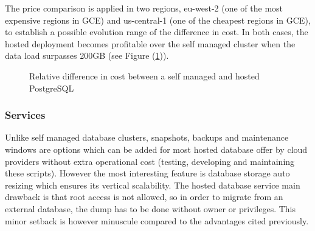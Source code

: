 \documentclass[11pt]{article}
\begin{document}
\pagebreak
The price comparison is applied in two regions, eu-west-2 (one of the most expensive regions in GCE) and us-central-1 (one of the cheapest regions in GCE), to establish a possible evolution range of the difference in cost. In both cases, the hosted deployment becomes profitable over the self managed cluster when the data load surpasses 200GB (see Figure (\ref{fig:bench_vulas_price})). 

\begin{figure}[h]
    
    \caption{Relative difference in cost between a self managed and hosted PostgreSQL}
    \label{fig:bench_vulas_price}
\end{figure}

\subsubsection{Services}

\hspace{5mm} Unlike self managed database clusters, snapshots, backups and maintenance windows are options which can be added for most hosted database offer by cloud providers without extra operational cost (testing, developing and maintaining these scripts). However the most interesting feature is database storage auto resizing which ensures its vertical scalability. The hosted database service main drawback is that root access is not allowed, so in order to migrate from an external database, the dump has to be done without owner or privileges. This minor setback is however minuscule compared to the advantages cited previously.
\end{document}
